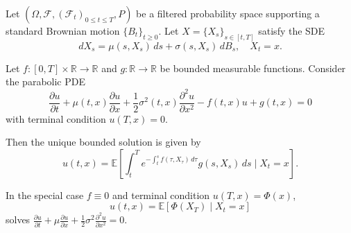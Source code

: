 \begin{theorem} \label{theorem:feynman_kac_formula_for_parabolic_pdes_and_ito_processes}
Let $(\Omega, \mathcal{F}, (\mathcal{F}_t)_{0 \leq t \leq T}, P)$ be a filtered probability space supporting a standard Brownian motion $\{B_t\}_{t \geq 0}$. Let $X = \{X_s\}_{s \in [t, T]}$ satisfy the SDE
$$dX_s = \mu(s, X_s) \, ds + \sigma(s, X_s) \, dB_s, \quad X_t = x.$$

Let $f: [0, T] \times \mathbb{R} \to \mathbb{R}$ and $g: \mathbb{R} \to \mathbb{R}$ be bounded measurable functions. Consider the parabolic PDE
$$\frac{\partial u}{\partial t} + \mu(t, x) \frac{\partial u}{\partial x} + \frac{1}{2}\sigma^2(t, x) \frac{\partial^2 u}{\partial x^2} - f(t, x)u + g(t, x) = 0$$
with terminal condition $u(T, x) = 0$.

Then the unique bounded solution is given by
$$u(t, x) = \mathbb{E}\left[\int_t^T e^{-\int_t^s f(\tau, X_\tau) \, d\tau} g(s, X_s) \, ds \;\bigg|\; X_t = x\right].$$

In the special case $f \equiv 0$ and terminal condition $u(T, x) = \Phi(x)$,
$$u(t, x) = \mathbb{E}\left[\Phi(X_T) \;\big|\; X_t = x\right]$$
solves $\tfrac{\partial u}{\partial t} + \mu \tfrac{\partial u}{\partial x} + \tfrac{1}{2}\sigma^2 \tfrac{\partial^2 u}{\partial x^2} = 0$.
\end{theorem}
